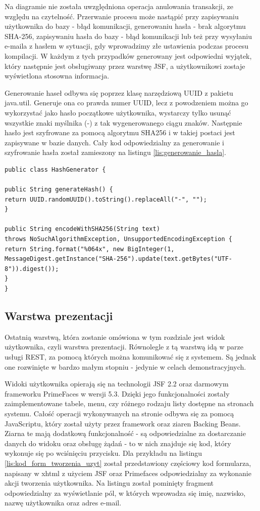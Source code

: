 Na diagramie nie została uwzględniona operacja anulowania transakcji, ze względu na czytelność. Przerwanie procesu może nastąpić przy zapisywaniu użytkownika do bazy - błąd komunikacji, generowaniu hasła - brak algorytmu SHA-256, zapisywaniu hasła do bazy - błąd komunikacji lub też przy wysyłaniu e-maila z hasłem w sytuacji, gdy wprowadzimy złe ustawienia podczas procesu kompilacji. W każdym z tych przypadków generowany jest odpowiedni wyjątek, który następnie jest obsługiwany przez warstwę JSF, a użytkownikowi zostaje wyświetlona stosowna informacja.

Generowanie haseł odbywa się poprzez klasę narzędziową UUID z pakietu java.util. Generuje ona co prawda numer UUID, lecz z powodzeniem można go wykorzystać jako hasło początkowe użytkownika, wystarczy tylko usunąć wszystkie znaki myślnika (-) z tak wygenerowanego ciągu znaków. Następnie hasło jest szyfrowane za pomocą algorytmu SHA256 i w takiej postaci jest zapisywane w bazie danych. Cały kod odpowiedzialny za generowanie i szyfrowanie hasła został zamieszony na listingu \ref{lis:generowanie_hasla}.

\begin{lstlisting}[caption={Klasa generująca i szyfrująca hasła}, label=lis:generowanie_hasla, numbers=none]
public class HashGenerator {

public String generateHash() {
return UUID.randomUUID().toString().replaceAll("-", "");
}

public String encodeWithSHA256(String text) 
throws NoSuchAlgorithmException, UnsupportedEncodingException {
return String.format("%064x", new BigInteger(1, 
MessageDigest.getInstance("SHA-256").update(text.getBytes("UTF-8")).digest());
}
}\end{lstlisting}

\subsection{Warstwa prezentacji}

Ostatnią warstwą, która zostanie omówiona w tym rozdziale jest widok użytkownika, czyli warstwa prezentacji. Równolegle z tą warstwą idą w parze usługi REST, za pomocą których można komunikować się z systemem. Są jednak one rozwinięte w bardzo małym stopniu - jedynie w celach demonstracyjnych.

Widoki użytkownika opierają się na technologii JSF 2.2 oraz darmowym frameworku PrimeFaces w wersji 5.3. Dzięki jego funkcjonalności zostały zaimplementowane tabele, menu, czy różnego rodzaju listy dostępne na stronach systemu. Całość operacji wykonywanych na stronie odbywa się za pomocą JavaScriptu, który został użyty przez framework oraz ziaren Backing Beans. Ziarna te mają dodatkową funkcjonalność - są odpowiedzialne za dostarczanie danych do widoku oraz obsługę żądań - to w nich znajduje się kod, który wykonuje się po wciśnięciu przycisku. Dla przykładu na listingu \ref{lis:kod_form_tworzenia_uzyt} został przedstawiony częściowy kod formularza, napisany w xhtml z użyciem JSF oraz Primefaces odpowiedzialny za wykonanie akcji tworzenia użytkownika. Na listingu został pominięty fragment odpowiedzialny za wyświetlanie pól, w których wprowadza się imię, nazwisko, nazwę użytkownika oraz adres e-mail.

